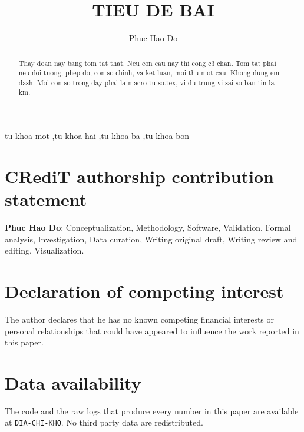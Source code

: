 \documentclass[preprint,review,12pt]{elsarticle}
\begin{document}
\begin{frontmatter}

\title{TIEU DE BAI}

\author[dau]{Phuc Hao Do}

\begin{abstract}
Thay doan nay bang tom tat that. Neu con cau nay thi cong c3 chan.
Tom tat phai neu doi tuong, phep do, con so chinh, va ket luan, moi thu mot cau.
Khong dung em-dash. Moi con so trong day phai la macro tu so.tex, vi du
trung vi sai so ban tin la \TLEmed{} km.
\end{abstract}

\begin{keyword}
tu khoa mot \sep tu khoa hai \sep tu khoa ba \sep tu khoa bon
\end{keyword}

\end{frontmatter}








\section*{CRediT authorship contribution statement}
\textbf{Phuc Hao Do}: Conceptualization, Methodology, Software, Validation, Formal analysis,
Investigation, Data curation, Writing original draft, Writing review and editing, Visualization.

\section*{Declaration of competing interest}
The author declares that he has no known competing financial interests or personal relationships
that could have appeared to influence the work reported in this paper.

\section*{Data availability}
The code and the raw logs that produce every number in this paper are available at
\texttt{DIA-CHI-KHO}. No third party data are redistributed.



\end{document}
